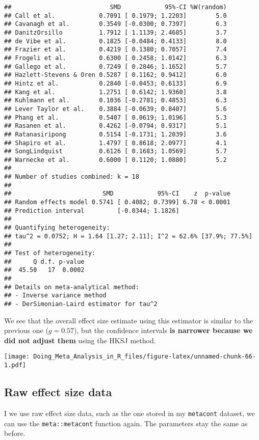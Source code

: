 \documentclass[]{book}
\theoremstyle{definition}
\theoremstyle{definition}
\theoremstyle{definition}
\theoremstyle{remark}
\begin{document}
\begin{verbatim}
##                           SMD            95%-CI %W(random)
## Call et al.            0.7091 [ 0.1979; 1.2203]        5.0
## Cavanagh et al.        0.3549 [-0.0300; 0.7397]        6.3
## DanitzOrsillo          1.7912 [ 1.1139; 2.4685]        3.7
## de Vibe et al.         0.1825 [-0.0484; 0.4133]        8.0
## Frazier et al.         0.4219 [ 0.1380; 0.7057]        7.4
## Frogeli et al.         0.6300 [ 0.2458; 1.0142]        6.3
## Gallego et al.         0.7249 [ 0.2846; 1.1652]        5.7
## Hazlett-Stevens & Oren 0.5287 [ 0.1162; 0.9412]        6.0
## Hintz et al.           0.2840 [-0.0453; 0.6133]        6.9
## Kang et al.            1.2751 [ 0.6142; 1.9360]        3.8
## Kuhlmann et al.        0.1036 [-0.2781; 0.4853]        6.3
## Lever Taylor et al.    0.3884 [-0.0639; 0.8407]        5.6
## Phang et al.           0.5407 [ 0.0619; 1.0196]        5.3
## Rasanen et al.         0.4262 [-0.0794; 0.9317]        5.1
## Ratanasiripong         0.5154 [-0.1731; 1.2039]        3.6
## Shapiro et al.         1.4797 [ 0.8618; 2.0977]        4.1
## SongLindquist          0.6126 [ 0.1683; 1.0569]        5.7
## Warnecke et al.        0.6000 [ 0.1120; 1.0880]        5.2
## 
## Number of studies combined: k = 18
## 
##                         SMD            95%-CI    z  p-value
## Random effects model 0.5741 [ 0.4082; 0.7399] 6.78 < 0.0001
## Prediction interval         [-0.0344; 1.1826]              
## 
## Quantifying heterogeneity:
## tau^2 = 0.0752; H = 1.64 [1.27; 2.11]; I^2 = 62.6% [37.9%; 77.5%]
## 
## Test of heterogeneity:
##      Q d.f. p-value
##  45.50   17  0.0002
## 
## Details on meta-analytical method:
## - Inverse variance method
## - DerSimonian-Laird estimator for tau^2
\end{verbatim}

We see that the overall effect size estimate using this estimator is
similar to the previous one (\(g=0.57\)), but the confidence intervals
\textbf{is narrower because we did not adjust them} using the HKSJ
method.

\texttt{[image: Doing\_Meta\_Analysis\_in\_R\_files/figure-latex/unnamed-chunk-66-1.pdf]}

\hypertarget{random.raw}{\subsection{Raw effect size
data}\label{random.raw}}

I we use raw effect size data, such as the one stored in my
\texttt{metacont} dataset, we can use the \texttt{meta::metacont}
function again. The parameters stay the same as before.
\end{document}
